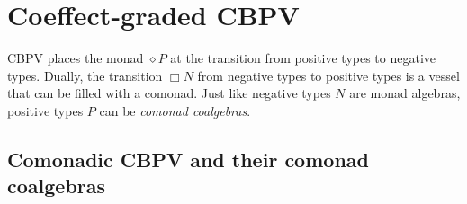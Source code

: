 \documentclass[acmsmall,review,anonymous]{acmart}\settopmatter{printfolios=true,printccs=false,printacmref=false}
\newcommand{\graybox}[1]{\grayboxtext{$#1$}}
\theoremstyle{remark}
\begin{document}
\section{Coeffect-graded CBPV}
\label{sec:coeff}

\newcommand{\lolli}{\multimap}
\newcommand{\qfun}[3]{#1#2 \lolli #3}
\newcommand{\gqfun}[3]{\graybox{#1#2 \lolli #3}}
\newcommand{\nbox}[1]{}
\newcommand{\tzip}{\mathsf{zip}}
\newcommand{\textract}{\mathsf{extract}}
\newcommand{\extract}[1][]{\textract_{#1}}
\newcommand{\tdisplay}{\mathsf{display}}
\newcommand{\display}[1][]{\tdisplay_{#1}}
\newcommand{\tduplicate}{\mathsf{duplicate}}
\newcommand{\duplicate}[1][]{\tduplicate_{#1}}
\newcommand{\tcobind}{\mathsf{cobind}}
\newcommand{\tbind}{\mathsf{bind}}
\newcommand{\tget}{\mathsf{get}}
\newcommand{\tmodify}{\mathsf{modify}}
\newcommand{\thead}{\ensuremath{\mathsf{head}}}
\newcommand{\ttail}{\ensuremath{\mathsf{tail}}}
\newcommand{\suc}{(\_{+}1)}
\newcommand{\Float}{\mathsf{Float}}
\newcommand{\tiso}{\mathsf{iso}}
\newcommand{\isot}{\tiso^\otimes}

CBPV places the monad $\diamond P$ at the transition from positive
types to negative types.  Dually, the transition $\Box N$ from
negative types to positive types is a vessel that can be filled with a
comonad.  Just like negative types $N$ are monad algebras, positive
types $P$ can be \emph{comonad coalgebras}.

\subsection{Comonadic CBPV and their comonad coalgebras}

\end{document}
